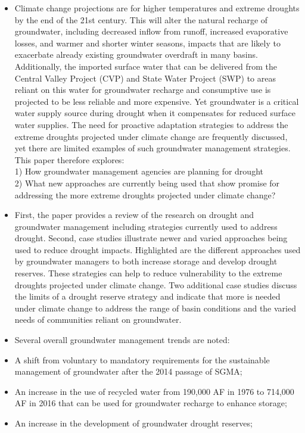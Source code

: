 \begin{itemize}
\begin{itemize}
\item Climate change projections are for higher temperatures and extreme droughts by the end of the 21st century. This will alter the natural recharge of groundwater, including decreased inflow from runoff, increased evaporative losses, and warmer and shorter winter seasons, impacts that are likely to exacerbate already existing groundwater overdraft in many basins. Additionally, the imported surface water that can be delivered from the Central Valley Project (CVP) and State Water Project (SWP) to areas reliant on this water for groundwater recharge and consumptive use is projected to be less reliable and more expensive. Yet groundwater is a critical water supply source during drought when it compensates for reduced surface water supplies. The need for proactive adaptation strategies to address the extreme droughts projected under climate change are frequently discussed, yet there are limited examples of such groundwater management strategies.\\ 
This paper therefore explores: \\
1) How groundwater management agencies are planning for drought \\
2) What new approaches are currently being used that show promise for addressing the more 
extreme droughts projected under climate change? \\
\item First, the paper provides a review of the research on drought and groundwater management including strategies currently used to address drought. Second, case studies illustrate newer and varied approaches being used to reduce drought impacts. Highlighted are the different approaches used by groundwater managers to both increase storage and develop drought reserves. These strategies can help to reduce vulnerability to the extreme droughts projected under climate change. Two additional case studies discuss the limits of a drought reserve strategy and indicate that more is needed under climate change to address the range of basin conditions and the varied needs of communities reliant on groundwater. 
\item Several overall groundwater management trends are noted:
\item A shift from voluntary to mandatory requirements for the sustainable management of 
groundwater after the 2014 passage of SGMA; \\
\item An increase in the use of recycled water from 190,000 AF in 1976 to 714,000 AF in 2016 that 
can be used for groundwater recharge to enhance storage; \\
\item An increase in the development of groundwater drought reserves; \\
\end{itemize}
\end{itemize}

